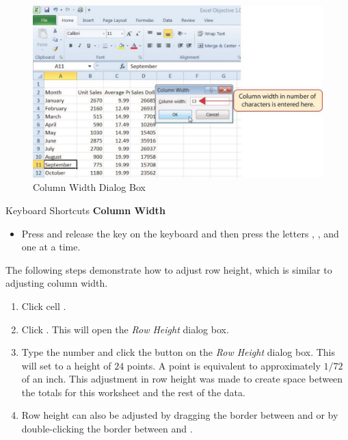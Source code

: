 \begin{figure}[H]
	\centering
	\includegraphics[width=\maxwidth{.95\linewidth}]{gfx/ch01_fig24}
	\caption{Column Width Dialog Box}
	\label{01:fig24}
\end{figure}

\begin{center}
	\begin{shtcutbox}{Keyboard Shortcuts}
		\textbf{Column Width}
		\\
		\begin{itemize}
			\setlength{\itemsep}{0pt}
			\setlength{\parskip}{0pt}
			\setlength{\parsep}{0pt}
			
			\item Press and release the  key on the keyboard and then press the letters , , and  one at a time.
			
		\end{itemize}
	\end{shtcutbox}
\end{center}

The following steps demonstrate how to adjust row height, which is similar to adjusting column width.

\begin{enumerate}
	\item Click cell .
	\item Click . This will open the \textit{Row Height} dialog box.
	\item Type the number  and click the  button on the \textit{Row Height} dialog box. This will set  to a height of $ 24 $ points. A point is equivalent to approximately $ 1/72 $ of an inch. This adjustment in row height was made to create space between the totals for this worksheet and the rest of the data.
	\item Row height can also be adjusted by dragging the border between  and  or by double-clicking the border between  and .
\end{enumerate}

